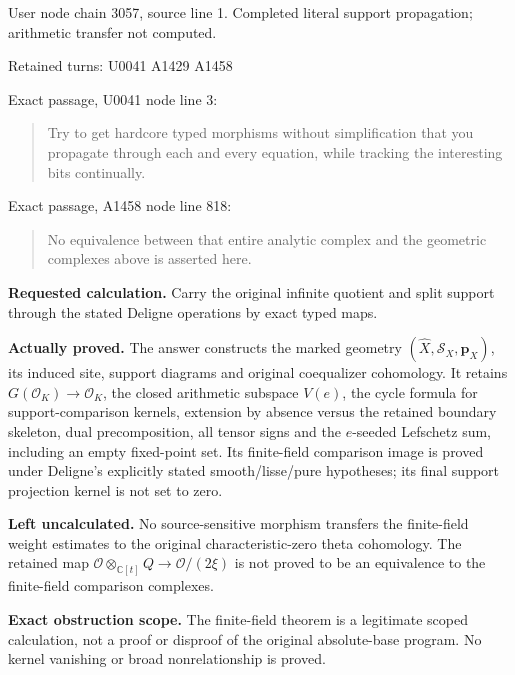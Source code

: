 User node \protect{} chain
3057, source line 1. Completed literal support propagation; arithmetic
transfer not computed.

Retained turns: U0041
\protect{} A1429
\protect{} A1458
\protect{}

Exact passage, U0041 node
\protect{} line 3:

\begin{quote}
Try to get hardcore typed morphisms without simplification that you
propagate through each and every equation, while tracking the
interesting bits continually.
\end{quote}

Exact passage, A1458 node
\protect{} line 818:

\begin{quote}
No equivalence between that entire analytic complex and the geometric
complexes above is asserted here.
\end{quote}

\textbf{Requested calculation.} Carry the original infinite quotient and
split support through the stated Deligne operations by exact typed maps.

\textbf{Actually proved.} The answer constructs the marked geometry
\((\widehat X,\mathcal S_X,\mathbf p_X)\), its induced site, support
diagrams and original coequalizer cohomology. It retains
\(G(\mathcal O_K)\to\mathcal O_K\), the closed arithmetic subspace
\(V(e)\), the cycle formula for support-comparison kernels, extension by
absence versus the retained boundary skeleton, dual precomposition, all
tensor signs and the \(e\)-seeded Lefschetz sum, including an empty
fixed-point set. Its finite-field comparison image is proved under
Deligne's explicitly stated smooth/lisse/pure hypotheses; its final
support projection kernel is not set to zero.

\textbf{Left uncalculated.} No source-sensitive morphism transfers the
finite-field weight estimates to the original characteristic-zero theta
cohomology. The retained map
\(\mathcal O\otimes_{\mathbb C[t]}Q\to\mathcal O/(2\xi)\) is not proved
to be an equivalence to the finite-field comparison complexes.

\textbf{Exact obstruction scope.} The finite-field theorem is a
legitimate scoped calculation, not a proof or disproof of the original
absolute-base program. No kernel vanishing or broad nonrelationship is
proved.

